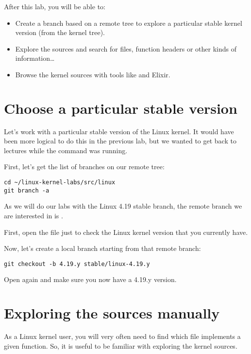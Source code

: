 
After this lab, you will be able to:

\begin{itemize}

\item Create a branch based on a remote tree to explore a particular
      stable kernel version (from the  kernel tree).
\item Explore the sources and search for files, function headers or
  other kinds of information\ldots
\item Browse the kernel sources with tools like  and Elixir.
\end{itemize}

\section{Choose a particular stable version}

Let's work with a particular stable version of the Linux kernel.
It would have been more logical to do this in the previous lab, but we
wanted to get back to lectures while the  command was
running.

First, let's get the list of branches on our  remote tree:

\begin{verbatim}
cd ~/linux-kernel-labs/src/linux
git branch -a
\end{verbatim}

As we will do our labs with the Linux 4.19 stable branch, the remote branch
we are interested in is .

First, open the  file just to check the Linux kernel
version that you currently have.

Now, let's create a local branch starting from that remote branch:
\begin{verbatim}
git checkout -b 4.19.y stable/linux-4.19.y
\end{verbatim}

Open  again and make sure you now have a 4.19.y version.

\section{Exploring the sources manually}

As a Linux kernel user, you will very often need to find which file
implements a given function. So, it is useful to be familiar with
exploring the kernel sources.

